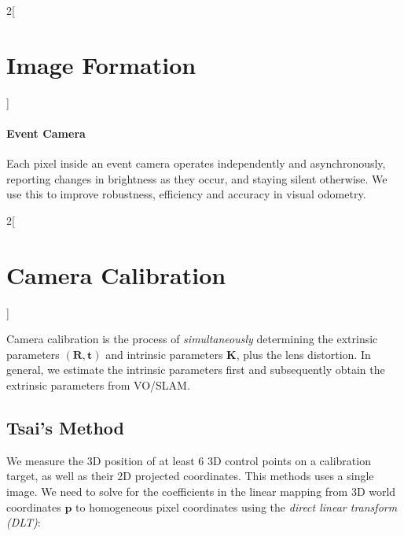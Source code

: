 \documentclass[oneside,fontsize=11pt,paper=a4]{scrartcl}
\begin{document}
\begin{multicols}{2}[\section{Image Formation}]
\paragraph{Event Camera} Each pixel inside an event camera operates independently and asynchronously, reporting changes in brightness as they occur, and staying silent otherwise. We use this to improve robustness, efficiency and accuracy in visual odometry.

\end{multicols}
\newpage


\begin{multicols}{2}[\section{Camera Calibration}]

Camera calibration is the process of \textit{simultaneously} determining the extrinsic parameters $(\mathbf{R}, \mathbf{t})$ and intrinsic parameters $\mathbf{K}$, plus the lens distortion. In general, we estimate the intrinsic parameters first and subsequently obtain the extrinsic parameters from VO/SLAM.

\subsection{Tsai's Method}
We measure the 3D position of at least 6 3D control points on a calibration target, as well as their 2D projected coordinates. This methods uses a single image. We need to solve for the coefficients in the linear mapping from 3D world coordinates $\mathbf{p}$ to homogeneous pixel coordinates using the \textit{direct linear transform (DLT)}:


\end{multicols}
\end{document}
